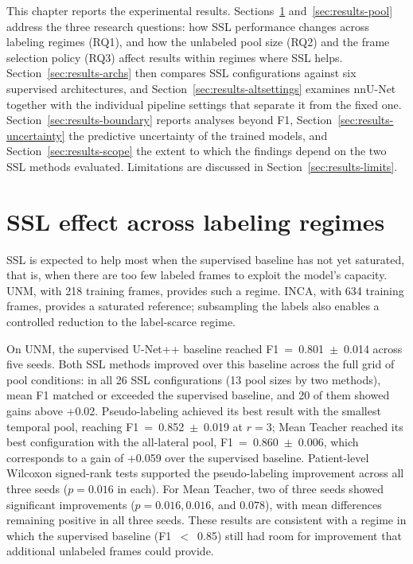 \documentclass[
  msc,
  american
]{ThesisPUC_v2}
\begin{document}
This chapter reports the experimental results. Sections~\ref{sec:results-ssl} and~\ref{sec:results-pool} address the three research questions: how SSL performance changes across labeling regimes (RQ1), and how the unlabeled pool size (RQ2) and the frame selection policy (RQ3) affect results within regimes where SSL helps. Section~\ref{sec:results-archs} then compares SSL configurations against six supervised architectures, and Section~\ref{sec:results-altsettings} examines nnU-Net together with the individual pipeline settings that separate it from the fixed one. Section~\ref{sec:results-boundary} reports analyses beyond F1, Section~\ref{sec:results-uncertainty} the predictive uncertainty of the trained models, and Section~\ref{sec:results-scope} the extent to which the findings depend on the two SSL methods evaluated. Limitations are discussed in Section~\ref{sec:results-limits}.

\section{SSL effect across labeling regimes}
\label{sec:results-ssl}

SSL is expected to help most when the supervised baseline has not yet saturated, that is, when there are too few labeled frames to exploit the model's capacity. UNM, with 218 training frames, provides such a regime. INCA, with 634 training frames, provides a saturated reference; subsampling the labels also enables a controlled reduction to the label-scarce regime.

On UNM, the supervised U-Net++ baseline reached F1~=~0.801~$\pm$~0.014 across five seeds. Both SSL methods improved over this baseline across the full grid of pool conditions: in all 26 SSL configurations (13 pool sizes by two methods), mean F1 matched or exceeded the supervised baseline, and 20 of them showed gains above +0.02. Pseudo-labeling achieved its best result with the smallest temporal pool, reaching F1~=~0.852~$\pm$~0.019 at $r=3$; Mean Teacher reached its best configuration with the all-lateral pool, F1~=~0.860~$\pm$~0.006, which corresponds to a gain of +0.059 over the supervised baseline. Patient-level Wilcoxon signed-rank tests supported the pseudo-labeling improvement across all three seeds ($p=0.016$ in each). For Mean Teacher, two of three seeds showed significant improvements ($p=0.016, 0.016$, and $0.078$), with mean differences remaining positive in all three seeds. These results are consistent with a regime in which the supervised baseline (F1~$<$~0.85) still had room for improvement that additional unlabeled frames could provide.
\end{document}
